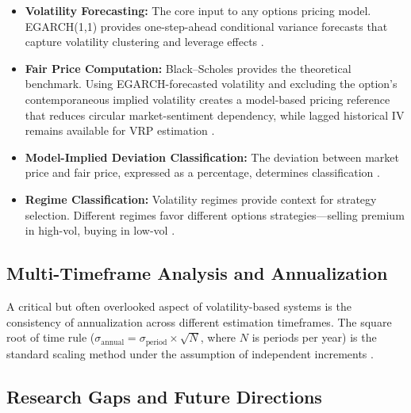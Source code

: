 \documentclass[journal]{IEEEtran}
\begin{document}
\begin{itemize}
  \item \textbf{Volatility Forecasting:} The core input to any options
    pricing model. EGARCH(1,1) provides one-step-ahead conditional
    variance forecasts that capture volatility clustering and leverage
    effects \cite{engle1982,nelson1991}.

  \item \textbf{Fair Price Computation:} Black--Scholes provides the
    theoretical benchmark. Using EGARCH-forecasted volatility and
    excluding the option's contemporaneous implied volatility creates
    a model-based pricing reference that reduces circular
    market-sentiment dependency, while lagged historical IV remains
    available for VRP estimation \cite{black1973,hull2022}.

  \item \textbf{Model-Implied Deviation Classification:} The deviation
    between market price and fair price, expressed as a percentage,
    determines classification \cite{nguyen2021}.

  \item \textbf{Regime Classification:} Volatility regimes provide
    context for strategy selection. Different regimes favor different
    options strategies---selling premium in high-vol, buying in
    low-vol \cite{heston1993,hamilton1994}.
\end{itemize}

\subsection{Multi-Timeframe Analysis and Annualization}

A critical but often overlooked aspect of volatility-based systems is
the consistency of annualization across different estimation timeframes.
The square root of time rule
($\sigma_\text{annual} = \sigma_\text{period} \times \sqrt{N}$, where
$N$ is periods per year) is the standard scaling method under the
assumption of independent increments \cite{tsay2010}.

\subsection{Research Gaps and Future Directions}
\end{document}
